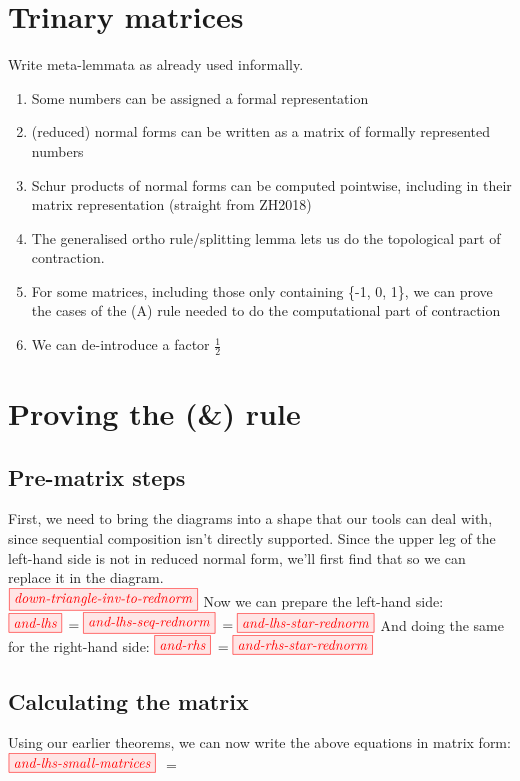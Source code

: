 \section{Trinary matrices}
\begin{TODOLIST}
    Write meta-lemmata as already used informally.
    \begin{enumerate}
        \item Some numbers can be assigned a formal representation
        \item (reduced) normal forms can be written as a matrix of formally %
            represented numbers
        \item Schur products of normal forms can be computed pointwise,
            including in their matrix representation (straight from ZH2018)
        \item The generalised ortho rule/splitting lemma lets us do the
            topological part of contraction.
        \item For some matrices, including those only containing \{-1, 0, 1\}, we
            can prove the cases of the (A) rule needed to do the computational
            part of contraction
        \item We can de-introduce a factor $\frac{1}{2}$
    \end{enumerate}
\end{TODOLIST}

\section{Proving the (\&) rule}

\subsection{Pre-matrix steps}
First, we need to bring the diagrams into a shape that our tools can deal with,
since sequential composition isn't directly supported. Since the upper leg of
the left-hand side is not in reduced normal form, we'll first find that so we
can replace it in the diagram.\\
$\tikzfig{down-triangle-inv-to-rednorm}$
Now we can prepare the left-hand side:\\
$\tikzfig{and-lhs}$ 
$= \tikzfig{and-lhs-seq-rednorm}$ 
$= \tikzfig{and-lhs-star-rednorm}$
And doing the same for the right-hand side:
$\tikzfig{and-rhs}$
$= \tikzfig{and-rhs-star-rednorm}$\\

\subsection{Calculating the matrix}
Using our earlier theorems, we can now write the above equations in matrix
form:\\
$\tikzfig{and-lhs-small-matrices}$
$= $
